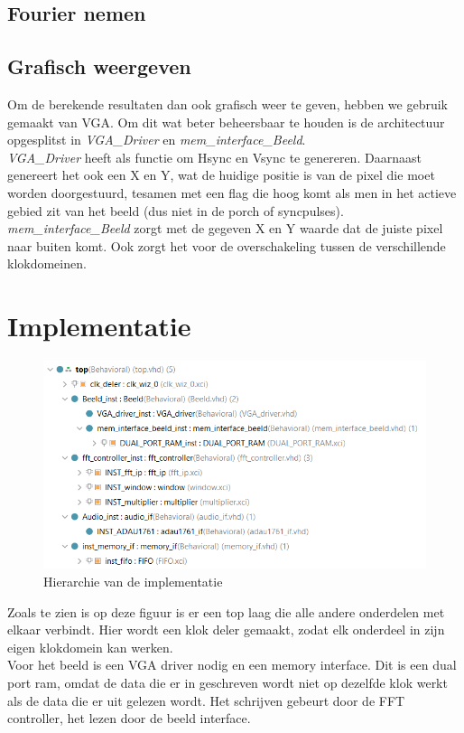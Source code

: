 \documentclass[a4paper,kul]{kulakarticle} %
\begin{document}
\subsection{Fourier nemen}

\subsection{Grafisch weergeven}
Om de berekende resultaten dan ook grafisch weer te geven, hebben we gebruik gemaakt van VGA. Om dit wat beter beheersbaar te houden is de architectuur opgesplitst in \textit{VGA\_Driver} en \textit{mem\_interface\_Beeld}.\\
\textit{VGA\_Driver} heeft als functie om Hsync en Vsync te genereren. Daarnaast genereert het ook een X en Y, wat de huidige positie is van de pixel die moet worden doorgestuurd, tesamen met een flag die hoog komt als men in het actieve gebied zit van het beeld (dus niet in de porch of syncpulses).\\
\textit{mem\_interface\_Beeld} zorgt met de gegeven X en Y waarde dat de juiste pixel naar buiten komt. Ook zorgt het voor de overschakeling tussen de verschillende klokdomeinen.

\section{Implementatie}

\begin{figure}[H]
	\centering
	\includegraphics[width=0.7\linewidth]{HierarchieVivado.png}
	\caption{Hierarchie van de implementatie}
	\label{fig:hierarchieVivado}
\end{figure}

Zoals te zien is op deze figuur is er een top laag die alle andere onderdelen met elkaar verbindt. Hier wordt een klok deler gemaakt, zodat elk onderdeel in zijn eigen klokdomein kan werken. \\

Voor het beeld is een VGA driver nodig en een memory interface. Dit is een dual port ram, omdat de data die er in geschreven wordt niet op dezelfde klok werkt als de data die er uit gelezen wordt. Het schrijven gebeurt door de FFT controller, het lezen door de beeld interface. \\
\end{document}
